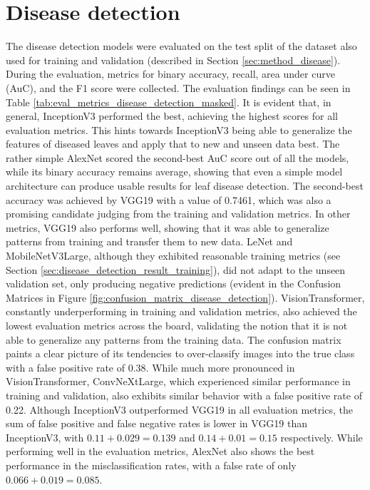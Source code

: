 \documentclass[draft,final]{vutinfth} %
\begin{document}
\section{Disease detection} \label{sec:results_disease}
The disease detection models were evaluated on the test split of the dataset also used for training and validation (described in Section \ref{sec:method_disease}). During the evaluation, metrics for binary accuracy, recall, area under curve (AuC), and the F1 score were collected. The evaluation findings can be seen in Table \ref{tab:eval_metrics_disease_detection_masked}.
\iffalse %
It is evident that, in general, InceptionV3 performed the best, achieving the highest scores for all evaluation metrics. This hints towards InceptionV3 being able to generalize the features of diseased leaves and apply that to new and unseen data best. 
The rather simple AlexNet scored the second-best AuC score out of all the models, while its binary accuracy remains average, showing that even a simple model architecture can produce usable results for leaf disease detection. The second-best accuracy was achieved by VGG19 with a value of 0.7461, which was also a promising candidate judging from the training and validation metrics. In other metrics, VGG19 also performs well, showing that it was able to generalize patterns from training and transfer them to new data. LeNet and MobileNetV3Large, although they exhibited reasonable training metrics (see Section \ref{sec:disease_detection_result_training}), did not adapt to the unseen validation set, only producing negative predictions (evident in the Confusion Matrices in Figure \ref{fig:confusion_matrix_disease_detection}). VisionTransformer, constantly underperforming in training and validation metrics, also achieved the lowest evaluation metrics across the board, validating the notion that it is not able to generalize any patterns from the training data. The confusion matrix paints a clear picture of its tendencies to over-classify images into the true class with a false positive rate of 0.38. While much more pronounced in VisionTransformer, ConvNeXtLarge, which experienced similar performance in training and validation, also exhibits similar behavior with a false positive rate of 0.22. Although InceptionV3 outperformed VGG19 in all evaluation metrics, the sum of false positive and false negative rates is lower in VGG19 than InceptionV3, with $0.11 + 0.029 = 0.139$ and $0.14 + 0.01 = 0.15$ respectively. While performing well in the evaluation metrics, AlexNet also shows the best performance in the misclassification rates, with a false rate of only $0.066 + 0.019 = 0.085$.
\end{document}
